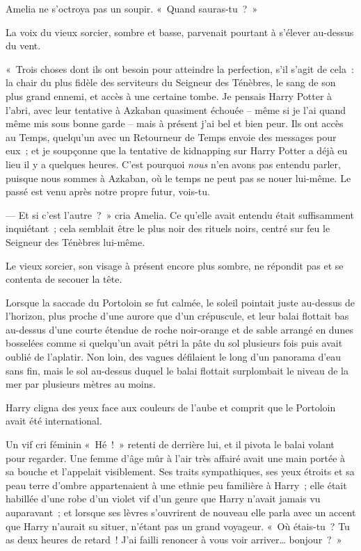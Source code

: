 Amelia ne s'octroya pas un soupir. «~Quand sauras-tu~?~»

La voix du vieux sorcier, sombre et basse, parvenait pourtant à s'élever au-dessus du vent.

«~Trois choses dont ils ont besoin pour atteindre la perfection, s'il s'agit de cela~: la chair du plus fidèle des serviteurs du Seigneur des Ténèbres, le sang de son plus grand ennemi, et accès à une certaine tombe. Je pensais Harry Potter à l'abri, avec leur tentative à Azkaban quasiment échouée -- même si je l'ai quand même mis sous bonne garde -- mais à présent j'ai bel et bien peur. Ils ont accès au Temps, quelqu'un avec un Retourneur de Temps envoie des messages pour eux~; et je soupçonne que la tentative de kidnapping sur Harry Potter a déjà eu lieu il y a quelques heures. C'est pourquoi \emph{nous} n'en avons pas entendu parler, puisque nous sommes à Azkaban, où le temps ne peut pas se nouer lui-même. Le passé est venu après notre propre futur, vois-tu.

--- Et si c'est l'autre~?~» cria Amelia. Ce qu'elle avait entendu était suffisamment inquiétant~; cela semblait être le plus noir des rituels noirs, centré sur feu le Seigneur des Ténèbres lui-même.

Le vieux sorcier, son visage à présent encore plus sombre, ne répondit pas et se contenta de secouer la tête.

\later

Lorsque la saccade du Portoloin se fut calmée, le soleil pointait juste au-dessus de l'horizon, plus proche d'une aurore que d'un crépuscule, et leur balai flottait bas au-dessus d'une courte étendue de roche noir-orange et de sable arrangé en dunes bosselées comme si quelqu'un avait pétri la pâte du sol plusieurs fois puis avait oublié de l'aplatir. Non loin, des vagues défilaient le long d'un panorama d'eau sans fin, mais le sol au-dessus duquel le balai flottait surplombait le niveau de la mer par plusieurs mètres au moins.

Harry cligna des yeux face aux couleurs de l'aube et comprit que le Portoloin avait été international.

Un vif cri féminin «~Hé~!~» retenti de derrière lui, et il pivota le balai volant pour regarder. Une femme d'âge mûr à l'air très affairé avait une main portée à sa bouche et l'appelait visiblement. Ses traits sympathiques, ses yeux étroits et sa peau terre d'ombre appartenaient à une ethnie peu familière à Harry~; elle était habillée d'une robe d'un violet vif d'un genre que Harry n'avait jamais vu auparavant~; et lorsque ses lèvres s'ouvrirent de nouveau elle parla avec un accent que Harry n'aurait su situer, n'étant pas un grand voyageur. «~Où étais-tu~? Tu as deux heures de retard~! J'ai failli renoncer à vous voir arriver… bonjour~?~»

